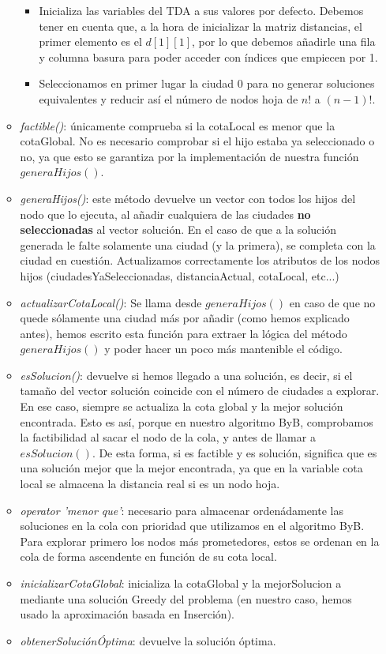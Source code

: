\documentclass{article}
\begin{document}
\begin{itemize}
\begin{itemize}
			\begin{itemize}
				\item Inicializa las variables del TDA a sus valores por defecto. Debemos tener en cuenta que, a la hora de inicializar la matriz distancias, el primer elemento es el $d[1][1]$, por lo que debemos añadirle una fila y columna basura para poder acceder con índices que empiecen por 1.
				\item Seleccionamos en primer lugar la ciudad 0 para no generar soluciones equivalentes y reducir así el número de nodos hoja de $n!$ a $(n-1)!$.
			\end{itemize}
			\item \textit {factible()}: únicamente comprueba si la cotaLocal es menor que la cotaGlobal. No es necesario comprobar si el hijo estaba ya seleccionado o no, ya que esto se garantiza por la implementación de nuestra función $generaHijos()$.
			\item \textit {generaHijos()}: este método devuelve un vector con todos los hijos del nodo que lo ejecuta, al añadir cualquiera de las ciudades \textbf{no seleccionadas} al vector solución. En el caso de que a la solución generada le falte solamente una ciudad (y la primera), se completa con la ciudad en cuestión. Actualizamos correctamente los atributos de los nodos hijos (ciudadesYaSeleccionadas, distanciaActual, cotaLocal, etc...)
			\item \textit{actualizarCotaLocal()}: Se llama desde $generaHijos()$ en caso de que no quede sólamente una ciudad más por añadir (como hemos explicado antes), hemos escrito esta función para extraer la lógica del método $generaHijos()$ y poder hacer un poco más mantenible el código.
			\item \textit{esSolucion()}: devuelve si hemos llegado a una solución, es decir, si el tamaño del vector solución coincide con el número de ciudades a explorar. En ese caso, siempre se actualiza la cota global y la mejor solución encontrada. Esto es así, porque en nuestro algoritmo ByB, comprobamos la factibilidad al sacar el nodo de la cola, y antes de llamar a $esSolucion()$. 
			De esta forma, si es factible y es solución, significa que es una solución mejor que la mejor encontrada, ya que en la variable cota local se almacena la distancia real si es un nodo hoja.
			\item \textit{operator 'menor que'}: necesario para almacenar ordenádamente las soluciones en la cola con prioridad que utilizamos en el algoritmo ByB. Para explorar primero los nodos más prometedores, estos se ordenan en la cola de forma ascendente en función de su cota local.
			\item \textit{inicializarCotaGlobal}: inicializa la cotaGlobal y la mejorSolucion a mediante una solución Greedy del problema (en nuestro caso, hemos usado la aproximación basada en Inserción).
			\item \textit{obtenerSoluciónÓptima}: devuelve la solución óptima.
		\end{itemize}
	\end{itemize}
\end{document}
